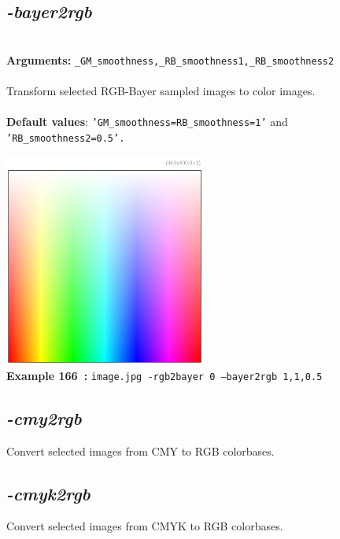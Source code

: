 \documentclass[a4paper,11pt,twoside]{book}
\begin{document}
\subsection{\emph{-bayer2rgb} }\vspace*{-0.5em}
~\\\textbf{Arguments: } 
{\small \texttt{\_GM\_smoothness,\_RB\_smoothness1,\_RB\_smoothness2}}\\~\\
Transform selected RGB-Bayer sampled images to color images.
~\\~\\\textbf{Default values}: {\small \texttt{'GM\_smoothness=RB\_smoothness=1'} and \texttt{'RB\_smoothness2=0.5'.}}
\begin{center}\includegraphics[keepaspectratio=true,height=7cm,width=\textwidth]{img/gmic_def166.jpg}\\
{\footnotesize \textbf{Example 166~:} \texttt{image.jpg -rgb2bayer 0 --bayer2rgb 1,1,0.5}}
\end{center}

\subsection{\emph{-cmy2rgb} }\vspace*{-0.5em}
Convert selected images from CMY to RGB colorbases.


\subsection{\emph{-cmyk2rgb} }\vspace*{-0.5em}
Convert selected images from CMYK to RGB colorbases.
\end{document}
